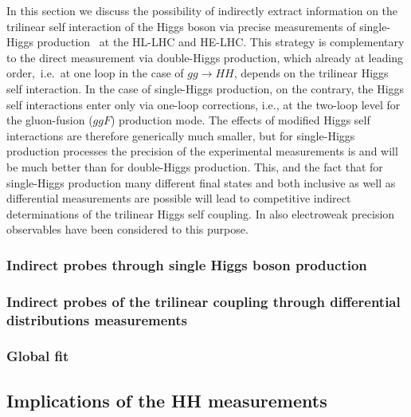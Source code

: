 \documentclass[../report.tex]{subfiles}
\providecommand{\main}{..}
\begin{document}
In this section we discuss the possibility of indirectly extract information on the trilinear self interaction of the Higgs boson via precise measurements of single-Higgs production~\cite{McCullough:2013rea,Gorbahn:2016uoy,Degrassi:2016wml,Bizon:2016wgr,DiVita:2017eyz,Barklow:2017awn,Maltoni:2017ims,DiVita:2017vrr,Maltoni:2018ttu} at the HL-LHC and HE-LHC. This strategy is complementary to the direct measurement via double-Higgs production, which already at leading order,~i.e.~at one loop in the case of $gg \to HH$, depends on the trilinear Higgs self interaction. In the case of single-Higgs production, on the contrary, the Higgs self interactions enter only via one-loop corrections, i.e., at the two-loop level for the gluon-fusion ($ggF$) production mode. The effects of modified Higgs self interactions are therefore generically much smaller, but for single-Higgs production processes the precision of the experimental measurements is and will be much better than for double-Higgs production. This, and the fact that for single-Higgs production many different final states and both inclusive as well as  differential measurements are possible will lead to competitive indirect determinations of the trilinear Higgs self coupling. In \cite{Degrassi:2017ucl,Kribs:2017znd} also electroweak precision observables have been considered to this purpose.

\subsubsection{Indirect probes through single Higgs boson production}



\subsubsection{Indirect probes of the trilinear coupling through differential distributions measurements}




\subsubsection{Global fit}
\label{sec:HH_Global_fit}


\subsection{Implications of the HH measurements}
\label{sec:HH_implications}
\end{document}
